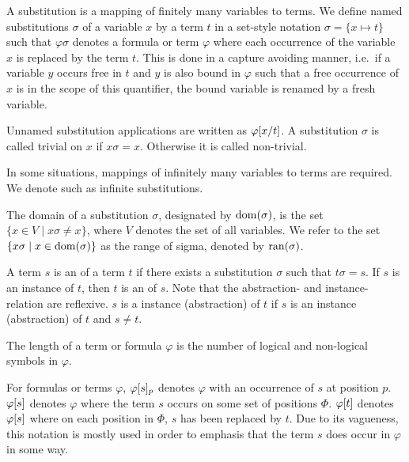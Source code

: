 

A substitution is a mapping of finitely many variables to terms.
We define named substitutions $\sigma$ of a variable $x$ by a term $t$ in a set-style notation $\sigma = \{ x \mapsto t\}$ such that 
$\varphi\sigma$ denotes a formula or term $\varphi$ where each occurrence of the variable $x$ is replaced by the term $t$.
This is done in a capture avoiding manner, i.e.\ if a variable $y$ occurs free in $t$ and $y$ is also bound in $\varphi$ such that a free occurrence of $x$ is in the scope of this quantifier, the bound variable is renamed by a fresh variable.

Unnamed substitution applications are written as $\varphi[x/t]$.
A substitution $\sigma$ is called trivial on $x$ if $x\sigma = x$. Otherwise it is called non-trivial.

In some situations, mappings of infinitely many variables to terms are required. We denote such as infinite substitutions.

The domain of a substitution $\sigma$, designated by $\operatorname{dom}(\sigma)$, is the set $\{x \in V \mid x\sigma \neq x\}$, where $V$ denotes the set of all variables.
We refer to the set $\{x\sigma \mid x\in \operatorname{dom}(\sigma)\}$ as the range of sigma, denoted by $\operatorname{ran}(\sigma)$. 





A term $s$ is an  of a term $t$ if there exists a substitution $\sigma$ such that $t\sigma = s$.
If $s$ is an instance of $t$, then $t$ is an  of $s$. Note that the abstraction- and instance-relation are reflexive. 
$s$ is a  instance (abstraction) of $t$ if $s$ is an instance (abstraction) of $t$ and $s\neq t$. 


The length of a term or formula $\varphi$ is the number of logical and non-logical symbols in $\varphi$.

For formulas or terms $\varphi$, $\varphi{\ensuremath{[s]}_{p}}$ denotes $\varphi$ with an occurrence of $s$ at position $p$.
$\varphi[s]$ denotes $\varphi$ where the term $s$ occurs on some set of positions $\Phi$. $\varphi[t]$ denotes $\varphi[s]$ where on each position in $\Phi$, $s$ has been replaced by $t$. Due to its vagueness, this notation is mostly used in order to emphasis that the term $s$ does occur in $\varphi$ in some way.


